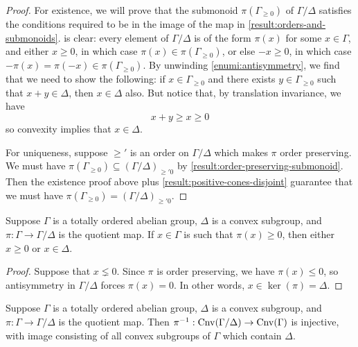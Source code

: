 \begin{proof}
For existence, we will prove that the submonoid $\pi(\Gamma_{\geq 0})$ of $\Gamma/\Delta$ satisfies the conditions required to be in the image of the map in \cref{result:orders-and-submonoids}.  is clear: every element of $\Gamma/\Delta$ is of the form $\pi(x)$ for some $x \in \Gamma$, and either $x \geq 0$, in which case $\pi(x) \in \pi(\Gamma_{\geq 0})$, or else $-x \geq 0$, in which case $-\pi(x) = \pi(-x) \in \pi(\Gamma_{\geq 0})$. By unwinding \cref{enumi:antisymmetry}, we find that we need to show the following: if $x \in \Gamma_{\geq 0}$ and there exists $y \in \Gamma_{\geq 0}$ such that $x + y \in \Delta$, then $x \in \Delta$ also. But notice that, by translation invariance, we have \[ x + y \geq x \geq 0 \] so convexity implies that $x \in \Delta$. 
	
For uniqueness, suppose $\geq'$ is an order on $\Gamma/\Delta$ which makes $\pi$ order preserving. We must have $\pi(\Gamma_{\geq 0}) \subseteq (\Gamma/\Delta)_{\geq' 0}$ by \cref{result:order-preserving-submonoid}. Then the existence proof above plus \cref{result:positive-cones-disjoint} guarantee that we must have $\pi(\Gamma_{\geq 0}) = (\Gamma/\Delta)_{\geq' 0}$. 
\end{proof}

\begin{lemma}
\label{result:quotient-order-positives}
Suppose $\Gamma$ is a totally ordered abelian group, $\Delta$ is a convex subgroup, and $\pi : \Gamma \to \Gamma/\Delta$ is the quotient map. If $x \in \Gamma$ is such that $\pi(x) \geq 0$, then either $x \geq 0$ or $x \in \Delta$. 
\end{lemma}

\begin{proof}
Suppose that $x \lneq 0$. Since $\pi$ is order preserving, we have $\pi(x) \leq 0$, so antisymmetry in $\Gamma/\Delta$ forces $\pi(x) = 0$. In other words, $x \in \ker(\pi) = \Delta$. 
\end{proof}

\begin{lemma}
\label{result:quotient-convex-subgroups}
Suppose $\Gamma$ is a totally ordered abelian group, $\Delta$ is a convex subgroup, and $\pi : \Gamma \to \Gamma/\Delta$ is the quotient map. Then $\pi^{-1} :  \operatorname{Cnv}(\Gamma/\Delta) \to \operatorname{Cnv}(\Gamma)$ is injective, with image consisting of all convex subgroups of $\Gamma$ which contain $\Delta$. 
\end{lemma}

